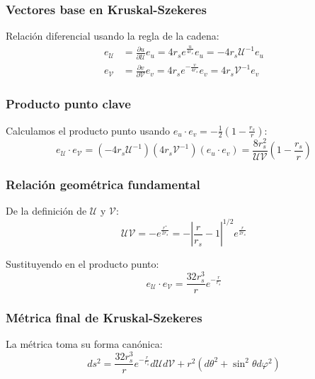 \subsubsection{Vectores base en Kruskal-Szekeres}
Relación diferencial usando la regla de la cadena:
\begin{equation}
    \begin{aligned}
        e_\mathcal{U} & = \frac{\partial u}{\partial \mathcal{U}} e_u = 4r_s e^{\frac{u}{4r_s}} e_u = -4r_s \mathcal{U}^{-1} e_u \\
        e_\mathcal{V} & = \frac{\partial v}{\partial \mathcal{V}} e_v = 4r_s e^{-\frac{v}{4r_s}} e_v = 4r_s \mathcal{V}^{-1} e_v
    \end{aligned}
\end{equation}

\subsubsection{Producto punto clave}
Calculamos el producto punto usando \( e_u \cdot e_v = -\frac{1}{2}\left(1-\frac{r_s}{r}\right) \):
\begin{equation}
    e_\mathcal{U} \cdot e_\mathcal{V} = (-4r_s \mathcal{U}^{-1})(4r_s \mathcal{V}^{-1})(e_u \cdot e_v) = \frac{8r_s^2}{\mathcal{U}\mathcal{V}}\left(1-\frac{r_s}{r}\right)
\end{equation}

\subsubsection{Relación geométrica fundamental}
De la definición de \( \mathcal{U} \) y \( \mathcal{V} \):
\begin{equation}
    \mathcal{U}\mathcal{V} = -e^{\frac{r^*}{2r_s}} = -\left|\frac{r}{r_s}-1\right|^{1/2}e^{\frac{r}{2r_s}}
\end{equation}

Sustituyendo en el producto punto:
\begin{equation}
    e_\mathcal{U} \cdot e_\mathcal{V} = \frac{32r_s^3}{r}e^{-\frac{r}{r_s}}
\end{equation}

\subsubsection{Métrica final de Kruskal-Szekeres}
La métrica toma su forma canónica:
\begin{equation}
    \boxed{ds^2 = \frac{32r_s^3}{r}e^{-\frac{r}{r_s}} d\mathcal{U}d\mathcal{V} + r^2(d\theta^2 + \sin^2\theta d\varphi^2)}
\end{equation}

